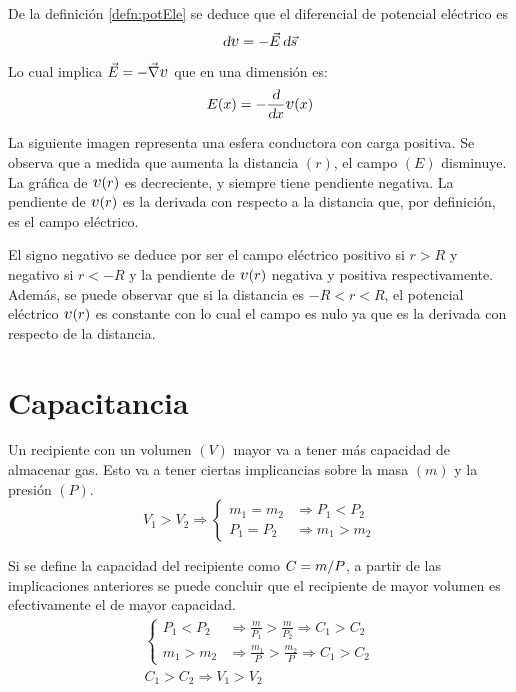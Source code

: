 \documentclass[a5paper,12pt,twoside]{book}
\begin{document}
De la definición \ref{defn:potEle} se deduce que el diferencial de potencial eléctrico es
\begin{equation*}
    \dif \voltage = - \Vec{E} \, \dif \Vec{s}
\end{equation*}

Lo cual implica $\Vec{E} = - \grad \voltage$ que en una dimensión es:
\begin{equation*}
    E(x) = - \frac{\dif}{\dif x} \voltage(x)
\end{equation*}

La siguiente imagen representa una esfera conductora con carga positiva. Se observa que a medida que aumenta la distancia $(r)$, el campo $(E)$ disminuye.
La gráfica de $\voltage(r)$ es decreciente, y siempre tiene pendiente negativa.
La pendiente de $\voltage(r)$ es la derivada con respecto a la distancia que, por definición, es el campo eléctrico.

\begin{center}
    \def\svgwidth{0.8\linewidth}
    
\end{center}

El signo negativo se deduce por ser el campo eléctrico positivo si $r > R$ y negativo si $r < -R$ y la pendiente de $\voltage(r)$ negativa y positiva respectivamente.
Además, se puede observar que si la distancia es $-R < r < R$, el potencial eléctrico $\voltage(r)$ es constante con lo cual el campo es nulo ya que es la derivada con respecto de la distancia.


\section{Capacitancia}

Un recipiente con un volumen $(V)$ mayor va a tener más capacidad de almacenar gas. Esto va a tener ciertas implicancias sobre la masa $(m)$ y la presión $(P)$.
\begin{equation*}
    V_1 > V_2 \Rightarrow
    \left\{
    \begin{aligned}
        m_1 = m_2 & \Rightarrow P_1 < P_2
        \\
        P_1 = P_2 & \Rightarrow m_1 > m_2
    \end{aligned}
    \right.
\end{equation*}

Si se define la capacidad del recipiente como $C= m/P$, a partir de las implicaciones anteriores se puede concluir que el recipiente de mayor volumen es efectivamente el de mayor capacidad.
\begin{gather*}
    \left\{
    \begin{aligned}
        P_1 < P_2 & \Rightarrow \frac{m}{P_1} > \frac{m}{P_2} \Rightarrow C_1 > C_2
        \\[1ex]
        m_1 > m_2 & \Rightarrow \frac{m_1}{P} > \frac{m_2}{P} \Rightarrow C_1 > C_2
    \end{aligned}
    \right.
    \\[1em]
    C_1 > C_2 \Rightarrow V_1 > V_2
\end{gather*}
\end{document}
